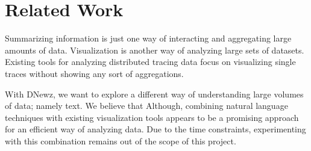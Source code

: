 \section{Related Work}

Summarizing information is just one way of interacting
and aggregating large amounts of data. Visualization is
another way of analyzing large sets of datasets.
Existing tools
for analyzing distributed tracing data focus on
visualizing single traces without showing any sort of aggregations.

With DNewz, we want to explore a different way of understanding large
volumes of data; namely text. We believe that 
Although, combining natural language techniques with existing visualization
tools appears to be a promising approach for an efficient way of analyzing data.
Due to the time constraints, experimenting with this combination remains
out of the scope of this project.